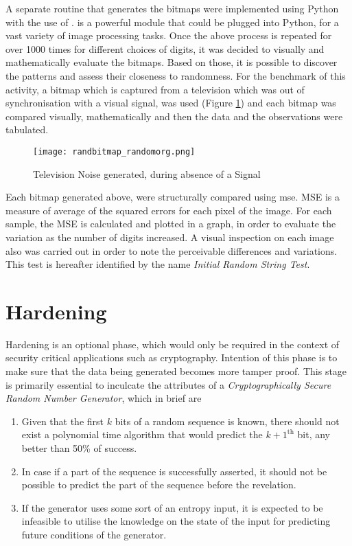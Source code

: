 A separate routine that generates the bitmaps were implemented using Python with the use of .  is a powerful module that could be plugged into Python, for a vast variety of image processing tasks. Once the above process is repeated for over 1000 times for different choices of digits, it was decided to visually and mathematically evaluate the bitmaps. Based on those, it is possible to discover the patterns and assess their closeness to randomness. For the benchmark of this activity, a bitmap which is captured from a television which was out of synchronisation with a visual signal, was used (Figure \ref{fig:radnbits_randomorg}) and each bitmap was compared visually, mathematically and then the data and the observations were tabulated.

\begin{figure}[h!]
    \texttt{[image: randbitmap\_randomorg.png]}
    \centering
    \caption{Television Noise generated, during absence of a Signal}
    \label{fig:radnbits_randomorg}
\end{figure}

Each bitmap generated above, were structurally compared using \acrfull{mse}. MSE is a measure of average of the squared errors for each pixel of the image. For each sample, the MSE is calculated and plotted in a graph, in order to evaluate the variation as the number of digits increased. A visual inspection on each image also was carried out in order to note the perceivable differences and variations. This test is hereafter identified by the name \textit{Initial Random String Test}.

\section{Hardening}\label{sec:hardening_details}

Hardening is an optional phase, which would only be required in the context of security critical applications such as cryptography. Intention of this phase is to make sure that the data being generated becomes more tamper proof. This stage is primarily essential to inculcate the attributes of a \textit{Cryptographically Secure Random Number Generator}, which in brief are

\begin{enumerate}
    \item Given that the first $k$ bits of a random sequence is known, there should not exist a polynomial time algorithm that would predict the $k+1^{\text{th}}$ bit, any better than 50\% of success.
    
    \item In case if a part of the sequence is successfully asserted, it should not be possible to predict the part of the sequence before the revelation.
    
    \item If the generator uses some sort of an entropy input, it is expected to be infeasible to utilise the knowledge on the state of the input for predicting future conditions of the generator.
\end{enumerate}

